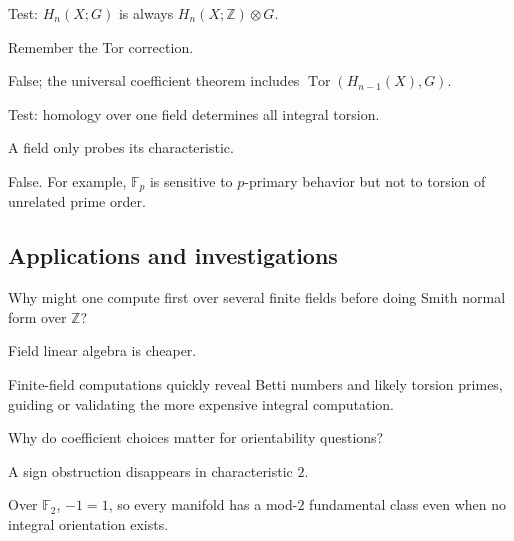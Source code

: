 \begin{exercise}\label{exr:viii25-ped-11}
Test: $H_n(X;G)$ is always $H_n(X;\mathbb Z)\otimes G$.
\end{exercise}
\begin{hint}
Remember the Tor correction.
\end{hint}
\begin{solution}
False; the universal coefficient theorem includes $\operatorname{Tor}(H_{n-1}(X),G)$.
\end{solution}

\begin{exercise}\label{exr:viii25-ped-12}
Test: homology over one field determines all integral torsion.
\end{exercise}
\begin{hint}
A field only probes its characteristic.
\end{hint}
\begin{solution}
False. For example, $\mathbb F_p$ is sensitive to $p$-primary behavior but not to torsion of unrelated prime order.
\end{solution}

\subsection*{Applications and investigations}

\begin{exercise}\label{exr:viii25-ped-13}
Why might one compute first over several finite fields before doing Smith normal form over $\mathbb Z$?
\end{exercise}
\begin{hint}
Field linear algebra is cheaper.
\end{hint}
\begin{solution}
Finite-field computations quickly reveal Betti numbers and likely torsion primes, guiding or validating the more expensive integral computation.
\end{solution}

\begin{exercise}\label{exr:viii25-ped-14}
Why do coefficient choices matter for orientability questions?
\end{exercise}
\begin{hint}
A sign obstruction disappears in characteristic $2$.
\end{hint}
\begin{solution}
Over $\mathbb F_2$, $-1=1$, so every manifold has a mod-$2$ fundamental class even when no integral orientation exists.
\end{solution}

